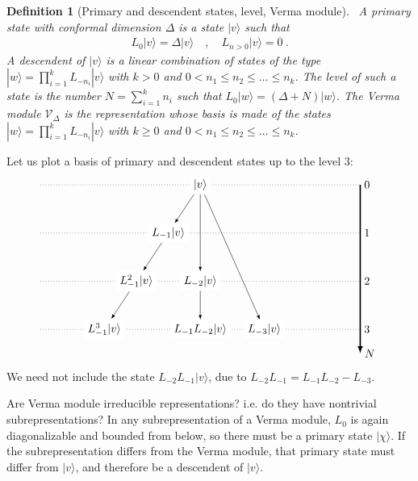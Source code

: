 \documentclass[12pt, a4paper]{article}
\theoremstyle{break}
\newtheorem{defn}[exo]{Definition}
\begin{document}
\begin{defn}[Primary and descendent states, level, Verma module]
 ~\label{def:prim}
 A primary state with conformal dimension $\Delta$ is a state $|v\rangle$ such that 
 \begin{align}
  L_0 |v\rangle = \Delta |v\rangle \quad , \quad L_{n>0} |v\rangle = 0\ .
 \end{align}
A descendent of $|v\rangle$ is a linear combination of states of the type $|w\rangle = \prod_{i=1}^k L_{-n_i} |v\rangle$ with $k>0$ and $0<n_1\leq n_2 \leq \dots \leq n_k$. 
The level of such a state is the number $N=\sum_{i=1}^k n_i$ such that $L_0|w\rangle = (\Delta + N)|w\rangle$. The Verma module $\mathcal V_\Delta$ is the representation whose basis is made of the states $|w\rangle = \prod_{i=1}^k L_{-n_i} |v\rangle$ with $k\geq 0$ and $0<n_1\leq n_2 \leq \dots \leq n_k$.
\end{defn}
Let us plot a basis of primary and descendent states up to the level $3$:
\begin{align}
 \begin{tikzpicture}[scale = .25, baseline=(current  bounding  box.center)]
  \draw[-latex, very thick] (20, 0) -- (20, -21) node [right] {$N$};
  \foreach \x in {0, ..., 3}
  {
  \draw [dotted] (-20, {-6*\x}) -- (20, {-6*\x}) node [right] {${\x}$};
  }
  \node[fill = white] at (0, 0) (0) {$|v\rangle$};
  \node[fill = white] at (-4,-6) (1) {$L_{-1}|v\rangle$};
  \node[fill = white] at (-8, -12) (11) {$L_{-1}^2|v\rangle$};
  \node[fill = white] at (-12, -18) (111) {$L_{-1}^3|v\rangle$};
  \node[fill = white] at (0,-12) (2) {$L_{-2}|v\rangle$};
  \node[fill = white] at (0,-18) (12) {$L_{-1}L_{-2}|v\rangle$};
  \node[fill = white] at (8,-18) (3) {$L_{-3}|v\rangle$};
  \draw[-latex] (0) -- (1);
  \draw[-latex] (1) -- (11);
  \draw[-latex] (11) -- (111);
  \draw[-latex] (0) -- (2);
  \draw[-latex] (0) -- (3);
  \draw[-latex] (2) -- (12);
 \end{tikzpicture}
\end{align}
We need not include the state $L_{-2}L_{-1}|v\rangle$, due to $L_{-2}L_{-1} = L_{-1}L_{-2} - L_{-3}$.

Are Verma module irreducible representations? i.e. do they have nontrivial subrepresentations? In any subrepresentation of a Verma module, $L_0$ is again diagonalizable and bounded from below, so there must be a primary state $|\chi\rangle$. If the subrepresentation differs from the Verma module, that primary state must differ from $|v\rangle$, and therefore be a descendent of $|v\rangle$.
\end{document}
